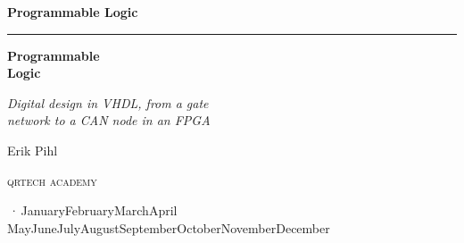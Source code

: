 %
\providecommand{\bookversion}{}
\newcommand{\bookdate}{\number\day\space\ifcase\month\or January\or February\or March\or April\or
  May\or June\or July\or August\or September\or October\or November\or December\fi\space
  \number\year}
\newcommand{\bookedition}{\ifx\bookversion\empty\else\bookversion\,·\,\fi\bookdate}

\thispagestyle{empty}
\vspace*{2.2in}
\begin{flushright}
  {\Large\bfseries Programmable Logic}
\end{flushright}
\cleardoublepage

\thispagestyle{empty}
\vspace*{1.1in}
\begin{flushleft}
  {\color{accent}\rule{0.9in}{2.5pt}}\par\vspace{1.4ex}
  {\fontsize{32}{38}\selectfont\bfseries Programmable\\[0.15ex] Logic\par}
  \vspace{2.2ex}
  {\Large\itshape Digital design in VHDL, from a gate\\network to a CAN node in an FPGA\par}
  \vspace{1.2in}
  {\large Erik Pihl\par}
  \vfill
  {\small\scshape\lsstyle qrtech academy\par}
  \vspace{0.6ex}
  {\small\color{muted} \bookedition\par}
\end{flushleft}
\newpage

